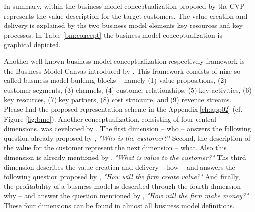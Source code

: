 In summary, within the business model conceptualization proposed by \citet[p. 54]{Johnson2008} the \ac{CVP} represents the value description for the target customers. The value creation and delivery is explained by the two business model elements key resources and key processes. In Table \ref{bm:concept} the business model conceptualization is graphical depicted.

%

Another well-known business model conceptualization respectively framework is the Business Model Canvas introduced by \citet{Osterwalder2010}. This framework consists of nine so-called business model building blocks -- namely (1) value propositions, (2) customer segments, (3) channels, (4) customer relationships, (5) key activities, (6) key resources, (7) key partners, (8) cost structure, and (9) revenue streams. Please find the proposed representation scheme in the Appendix \ref{ch:app02} (cf. Figure \ref{fig:bmc}). Another conceptualization, consisting of four central dimensions, was developed by \citet{Frankenberger2013}. The first dimension -- who -- answers the following question already proposed by \citet[pp. 49-61]{Drucker1954}, \textit{"Who is the customer?"} Second, the description of the value for the customer represent the next dimension -- what. Also this dimension is already mentioned by \citet[pp. 49-61]{Drucker1954}, \textit{"What is value to the customer?"} The third dimension describes the value creation and delivery -- how -- and answers the following question proposed by \citet[pp. 729-732]{Morris2005}, \textit{"How will the firm create value?"} And finally, the profitability of a business model is described through the fourth dimension -- why -- and answer the question mentioned by \citet[pp. 729-732]{Morris2005}, \textit{"How will the firm make money?"} These four dimensions can be found in almost all business model definitions.

